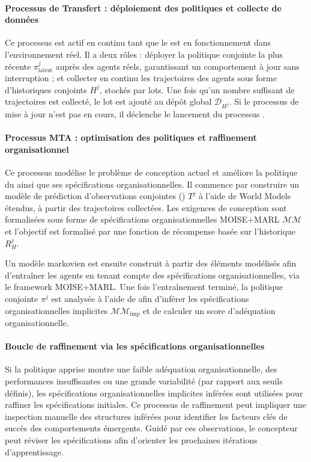 \paragraph{Processus de Transfert : déploiement des politiques et collecte de données}

Ce processus est actif en continu tant que le  est en fonctionnement dans l'environnement réel. Il a deux rôles : déployer la politique conjointe la plus récente $\pi^j_{\text{latest}}$ auprès des agents réels, garantissant un comportement à jour sans interruption ; et collecter en continu les trajectoires des agents sous forme d'historiques conjoints $H^j$, stockés par lots. Une fois qu'un nombre suffisant de trajectoires est collecté, le lot est ajouté au dépôt global $\mathcal{D}_{H^j}$. Si le processus de mise à jour n'est pas en cours, il déclenche le lancement du processus \textit{}.

\paragraph{Processus MTA : optimisation des politiques et raffinement organisationnel}

Ce processus modélise le problème de conception actuel et améliore la politique du  ainsi que ses spécifications organisationnelles. Il commence par construire un modèle de prédiction d'observations conjointes () $T^j$ à l'aide de World Models étendus, à partir des trajectoires collectées. Les exigences de conception sont formalisées sous forme de spécifications organisationnelles MOISE+MARL $\mathcal{MM}$ et l'objectif est formalisé par une fonction de récompense basée sur l'historique $R^j_H$.

Un modèle markovien est ensuite construit à partir des éléments modélisés afin d'entraîner les agents en tenant compte des spécifications organisationnelles, via le framework MOISE+MARL. Une fois l'entraînement terminé, la politique conjointe $\pi^j$ est analysée à l'aide de  afin d'inférer les spécifications organisationnelles implicites $\mathcal{MM}_{\text{imp}}$ et de calculer un score d'adéquation organisationnelle.

\paragraph{Boucle de raffinement via les spécifications organisationnelles}

Si la politique apprise montre une faible adéquation organisationnelle, des performances insuffisantes ou une grande variabilité (par rapport aux seuils définis), les spécifications organisationnelles implicites inférées sont utilisées pour raffiner les spécifications initiales. Ce processus de raffinement peut impliquer une inspection manuelle des structures inférées pour identifier les facteurs clés de succès des comportements émergents. Guidé par ces observations, le concepteur peut réviser les spécifications afin d'orienter les prochaines itérations d'apprentissage.

